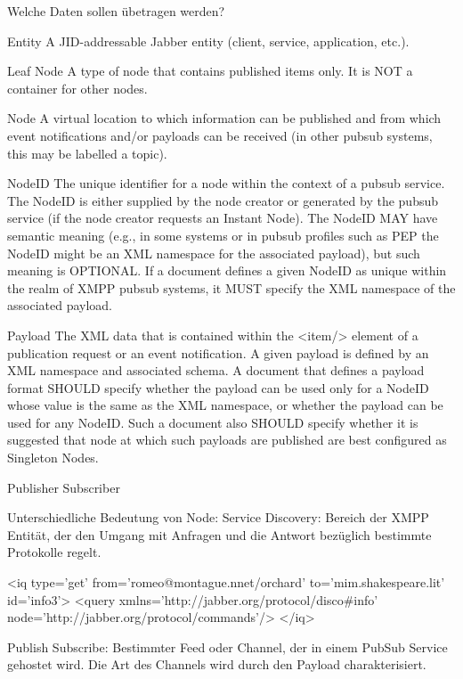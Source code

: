 \documentclass[a4paper]{article}
\begin{document}
Welche Daten sollen übetragen werden?

Entity
A JID-addressable Jabber entity (client, service, application, etc.).

Leaf Node
A type of node that contains published items only. It is NOT a container for other nodes.

Node
A virtual location to which information can be published and from which event notifications and/or payloads can be received (in other pubsub systems, this may be labelled a topic).

NodeID
The unique identifier for a node within the context of a pubsub service. The NodeID is either supplied by the node creator or generated by the pubsub service (if the node creator requests an Instant Node). The NodeID MAY have semantic meaning (e.g., in some systems or in pubsub profiles such as PEP the NodeID might be an XML namespace for the associated payload), but such meaning is OPTIONAL. If a document defines a given NodeID as unique within the realm of XMPP pubsub systems, it MUST specify the XML namespace of the associated payload.

Payload
The XML data that is contained within the <item/> element of a publication request or an event notification. A given payload is defined by an XML namespace and associated schema. A document that defines a payload format SHOULD specify whether the payload can be used only for a NodeID whose value is the same as the XML namespace, or whether the payload can be used for any NodeID. Such a document also SHOULD specify whether it is suggested that node at which such payloads are published are best configured as Singleton Nodes.

Publisher
Subscriber

Unterschiedliche Bedeutung von Node:
Service Discovery: Bereich der XMPP Entität, der den Umgang mit Anfragen und die Antwort bezüglich bestimmte Protokolle regelt.

<iq type='get'
    from='romeo@montague.nnet/orchard'
    to='mim.shakespeare.lit'
    id='info3'>
  <query xmlns='http://jabber.org/protocol/disco\#info' 
         node='http://jabber.org/protocol/commands'/>
</iq>
    


Publish Subscribe: Bestimmter Feed oder Channel, der in einem PubSub Service gehostet wird. Die Art des Channels wird durch den Payload charakterisiert.
\end{document}
